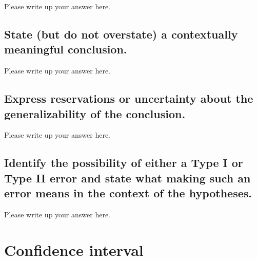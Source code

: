 \documentclass[
]{book}
\begin{document}
Please write up your answer here.

\hypertarget{state-but-do-not-overstate-a-contextually-meaningful-conclusion.-2}{%
\subsection*{State (but do not overstate) a contextually meaningful conclusion.}\label{state-but-do-not-overstate-a-contextually-meaningful-conclusion.-2}}

Please write up your answer here.

\hypertarget{express-reservations-or-uncertainty-about-the-generalizability-of-the-conclusion.-2}{%
\subsection*{Express reservations or uncertainty about the generalizability of the conclusion.}\label{express-reservations-or-uncertainty-about-the-generalizability-of-the-conclusion.-2}}

Please write up your answer here.

\hypertarget{identify-the-possibility-of-either-a-type-i-or-type-ii-error-and-state-what-making-such-an-error-means-in-the-context-of-the-hypotheses.-2}{%
\subsection*{Identify the possibility of either a Type I or Type II error and state what making such an error means in the context of the hypotheses.}\label{identify-the-possibility-of-either-a-type-i-or-type-ii-error-and-state-what-making-such-an-error-means-in-the-context-of-the-hypotheses.-2}}

Please write up your answer here.

\hypertarget{confidence-interval}{%
\section*{Confidence interval}\label{confidence-interval}}
\end{document}
